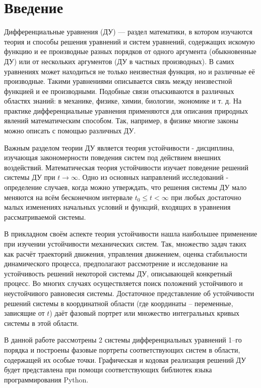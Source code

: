 \documentclass{article}
\begin{document}
\section{Введение}
Дифференциальные уравнения (ДУ) — раздел математики, в котором изучаются теория и
способы решения уравнений и систем уравнений, содержащих искомую функцию и ее производные разных порядков от одного аргумента (обыкновенные ДУ) или от нескольких аргументов (ДУ в частных производных). В самих уравнениях может находиться не только неизвестная функция, но и различные её производные. Такими уравнениями описывается связь между неизвестной функцией и ее производными. Подобные связи отыскиваются в различных областях знаний: в механике, физике, химии, биологии, экономике и т. д. На практике дифференциальные уравнения применяются для описания природных явлений математическим способом.
Так, например, в  физике многие законы можно описать с помощью различных ДУ.\par
Важным разделом теории ДУ является теория устойчивости - дисциплина, изучающая закономерности поведения систем под действием внешних воздействий. Математическая теория устойчивости изучает поведение решений системы ДУ при $t\xrightarrow{}\infty$. Одно из основных направлений исследований - определение случаев, когда можно утверждать, что решения системы ДУ мало меняются на всём бесконечном интервале $t_0\leq t < \infty$ при любых достаточно малых изменениях начальных условий и функций, входящих в уравнения рассматриваемой системы.\par
В прикладном своём аспекте теория устойчивости нашла наибольшее применение при изучении устойчивости механических систем. Так, множество задач таких как расчёт траекторий движения, управления движением, оценка стабильности динамического процесса, предполагают рассмотрение и исследование на устойчивость решений некоторой системы ДУ, описывающей конкретный процесс. Во многих случаях осуществляется поиск положений устойчивого и неустойчивого равновесия системы.
Достаточное представление об устойчивости решений системы в координатной области (где координаты – переменные, зависящие от $t$) даёт фазовый портрет или множество интегральных
кривых системы в этой области.\par
В данной работе рассмотрены 2 системы дифференциальных уравнений 1–го порядка
и построены фазовые портреты соответствующих систем в области, содержащей их особые
точки. Графическая и кодовая реализация решений ДУ будет представлена при помощи соответствующих библиотек языка программирования Python.
\end{document}
